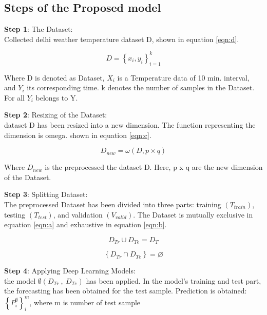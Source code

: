\documentclass[sn-mathphys,Numbered]{sn-jnl}
\theoremstyle{thmstyleone}
\theoremstyle{thmstyletwo}
\theoremstyle{thmstylethree}
\begin{document}
\subsection{Steps of the Proposed model}
\par {\textbf{Step 1}: The Dataset:}\\ Collected delhi weather temperature dataset D, shown in equation \ref{eqn:d}.

\begin{equation}
\label{eqn:d}
D=\left \{ x_i, y_i \right \}_{i=1}^{k}
\end{equation}

Where D is denoted as Dataset, \(X_i\) is a Temperature data of 10 min. interval, and \(Y_i\) its corresponding time. k denotes the number of samples in the Dataset. For all \(Y_i\) belongs to Y.

\par {\textbf{Step 2}: Resizing of the Dataset:}\\ dataset D has been resized into a new dimension. The function representing the dimension is omega. shown in equation \ref{eqn:c}.

\begin{equation}
\label{eqn:c}
D_{new}=\omega \left ( D, p  \times q \right )
\end{equation}

Where \(D_{new}\) is the preprocessed the dataset D. Here,  p x q  are the new dimension of the Dataset.

\par {\textbf{Step 3}: Splitting Dataset:}\\ The preprocessed Dataset has been divided into three parts: training \((T_{train})\), testing \((T_{test})\), and validation \((V_{valid})\). The Dataset is mutually exclusive in equation \ref{eqn:a} and exhaustive in equation \ref{eqn:b}.

\begin{equation}
\label{eqn:a}
D_{Tr}\cup D_{Te}=D_{T}
\end{equation}

\begin{equation}
\label{eqn:b}
\left \{ D_{Tr} \cap D_{Te} \right \}=\varnothing 
\end{equation}

\par {\textbf{Step 4}: Applying Deep Learning Models:}\\ the model \(\emptyset\left(D_{Tr}\ ,\ D_{Te}\right)\) has been applied. In the model's training and test part, the forecasting has been obtained for the test sample. Prediction is obtained:\(\left\{P_i^\emptyset\right\}_i^m\),  where m is number of test sample %
\end{document}
